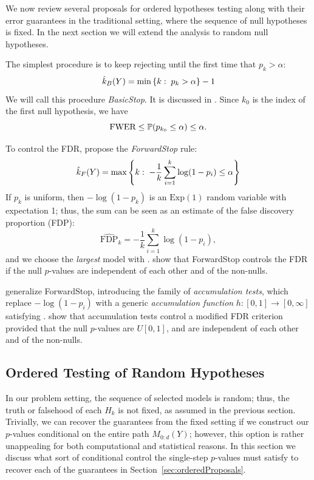 \documentclass{article}
\begin{document}
We now review several proposals for ordered hypotheses testing along with their error guarantees in the traditional setting, where the sequence of null hypotheses is fixed. In the next section we will extend the analysis to random null hypotheses.

The simplest procedure is to keep rejecting until the first time that $p_k > \alpha$: 
\[
\hk_B(Y) = \min\left\{k:\; p_k > \alpha\right\} - 1
\]
We will call this procedure {\em BasicStop}. It is discussed in \citet{marcus1976}.
Since $k_0$ is the index of the first null hypothesis, we have
\begin{equation}\label{eq:basic-stop-control}
 \text{FWER} \leq \P(p_{k_0} \leq \alpha) \leq \alpha.
\end{equation}

To control the FDR, \citet{gsell2013sequential} propose the {\em ForwardStop} rule:
\[
  \hk_{F}(Y) = \max\left\{k:\;
    -\frac{1}{k}\sum_{i=1}^k \log(1-p_i) \leq \alpha\right\}
\]
If $p_k$ is uniform, then $-\log(1-p_k)$ is an $\text{Exp}(1)$ random variable with expectation 1; thus, the sum can be seen as an estimate of the false discovery proportion (FDP):
\[
\widehat{\text{FDP}}_k = -\frac{1}{k}\sum_{i=1}^k \log(1-p_i),
\]
and we choose the {\em largest} model with . \citet{gsell2013sequential} show that ForwardStop controls the FDR if the null $p$-values are independent of each other and of the non-nulls.

\citet{li2015accumulation} generalize ForwardStop, introducing the family of {\em accumulation tests}, which replace $-\log(1-p_i)$ with a generic {\em accumulation function} $h: [0,1] \rightarrow [0,\infty]$ satisfying . \citet{li2015accumulation} show that accumulation tests control a modified FDR criterion provided that the null $p$-values are $U[0,1]$, and are independent of each other and of the non-nulls.


\subsection{Ordered Testing of Random Hypotheses}\label{sec:random-hyp}

In our problem setting, the sequence of selected models is random; thus, the truth or falsehood of each $H_k$ is not fixed, as assumed in the previous section. Trivially, we can recover the guarantees from the fixed setting if we construct our $p$-values conditional on the entire path $M_{0:d}(Y)$; however, this option is rather unappealing for both computational and statistical reasons. In this section we discuss what sort of conditional control the single-step $p$-values must satisfy to recover each of the guarantees in Section~\ref{sec:orderedProposals}.
\end{document}
